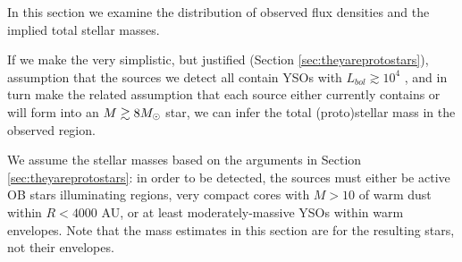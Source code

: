 \documentclass[twocolumn]{aastex61}
\begin{document}
In this section we examine the distribution of observed flux densities and the
implied total stellar masses.  


If we make the very simplistic, but justified (Section
\ref{sec:theyareprotostars}), assumption that the sources we detect all contain
YSOs with $L_{bol}\gtrsim10^4$ \lsun, and in turn make the related
assumption that each source either currently contains or will form into an
$M\gtrsim8 M_{\odot}$ star, we can infer the total (proto)stellar mass in the
observed region.


We assume the stellar masses based on the arguments in Section
\ref{sec:theyareprotostars}: in order to be detected, the sources must either
be active OB stars illuminating \hii regions, very compact cores with $M>10$
\msun of warm dust within $R<4000$ AU, or at least moderately-massive YSOs
within warm envelopes.  Note that the mass estimates in this section are for
the resulting stars, not their envelopes.  

\end{document}
